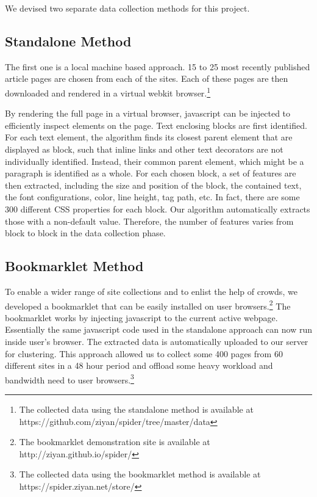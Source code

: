 \documentclass{acm_proc_article-sp}
\begin{document}
We devised two separate data collection methods for this project.

\subsection{Standalone Method}

The first one is a local machine based approach. 15 to 25 most recently published article pages are chosen from each of the sites. Each of these pages are then downloaded and rendered in a virtual webkit browser.\footnote{The collected data using the standalone method is available at https://github.com/ziyan/spider/tree/master/data}

By rendering the full page in a virtual browser, javascript can be injected to efficiently inspect elements on the page. Text enclosing blocks are first identified. For each text element, the algorithm finds its closest parent element that are displayed as block, such that inline links and other text decorators are not individually identified. Instead, their common parent element, which might be a paragraph is identified as a whole. For each chosen block, a set of features are then extracted, including the size and position of the block, the contained text, the font configurations, color, line height, tag path, etc. In fact, there are some 300 different CSS properties for each block. Our algorithm automatically extracts those with a non-default value. Therefore, the number of features varies from block to block in the data collection phase.

\subsection{Bookmarklet Method}

To enable a wider range of site collections and to enlist the help of crowds, we developed a bookmarklet that can be easily installed on user browsers.\footnote{The bookmarklet demonstration site is available at http://ziyan.github.io/spider/} The bookmarklet works by injecting javascript to the current active webpage. Essentially the same javascript code used in the standalone approach can now run inside user's browser. The extracted data is automatically uploaded to our server for clustering. This approach allowed us to collect some 400 pages from 60 different sites in a 48 hour period and offload some heavy workload and bandwidth need to user browsers.\footnote{The collected data using the bookmarklet method is available at https://spider.ziyan.net/store/}
\end{document}
